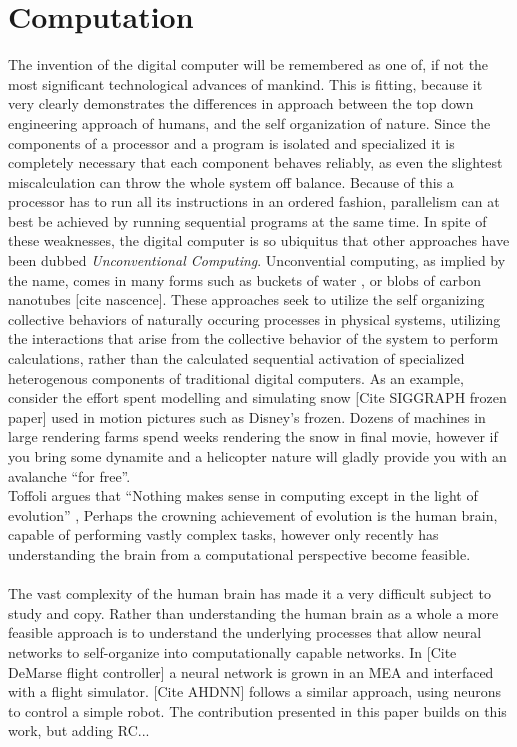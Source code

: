 \section{Computation}
The invention of the digital computer will be remembered as one of, if not the
most significant technological advances of mankind.
This is fitting, because it very clearly demonstrates the differences in
approach between the top down engineering approach of humans, and the self
organization of nature.
Since the components of a processor and a program is isolated and specialized it
is completely necessary that each component behaves reliably, as even the
slightest miscalculation can throw the whole system off balance.
Because of this a processor has to run all its instructions in an ordered
fashion, parallelism can at best be achieved by running sequential programs at
the same time.
In spite of these weaknesses, the digital computer is so ubiquitus
that other approaches have been dubbed \emph{Unconventional Computing}.
Unconvential computing, as implied by the name, comes in many forms such as
buckets of water \cite{fernando_pattern_2003}, or blobs of carbon nanotubes
[cite nascence]. 
These approaches seek to utilize the self organizing collective behaviors of
naturally occuring processes in physical systems, utilizing the interactions
that arise from the collective behavior of the system to perform calculations,
rather than the calculated sequential activation of specialized heterogenous
components of traditional digital computers.
As an example, consider the effort spent modelling and simulating snow [Cite
SIGGRAPH frozen paper] used in motion pictures such as Disney's frozen. Dozens
of machines in large rendering farms spend weeks rendering the snow in final
movie, however if you bring some dynamite and a helicopter nature will gladly
provide you with an avalanche ``for free''.\\
%
Toffoli argues that ``Nothing makes sense in computing except in the light of
evolution'' \cite{tommaso_toffoli_nothing_nodate}, 
%
%
Perhaps the crowning achievement of evolution is the human brain, capable of
performing vastly complex tasks, however only recently has understanding the
brain from a computational perspective become feasible.
\\ \\
The vast complexity of the human brain has made it a very difficult subject to
study and copy. Rather than understanding the human brain as a whole a more
feasible approach is to understand the underlying processes that allow neural
networks to self-organize into computationally capable networks.
In [Cite DeMarse flight controller] a neural network is grown in an MEA and
interfaced with a flight simulator. [Cite AHDNN] follows a similar approach,
using neurons to control a simple robot. The contribution presented in this
paper builds on this work, but adding RC...

\cleardoublepage

